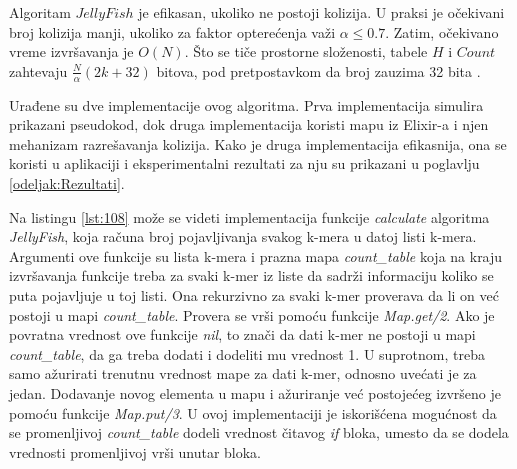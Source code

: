 \documentclass[12pt,oneside]{memoir}
\begin{document}
\begin{comment}

\begin{figure}[!ht]
  \centering
  \texttt{[image: 58\_3algoritma.PNG]}
  \caption{Razmatra se skup 4-mera $Z = \{AC; CG; AC; GT; CA; GG; AC; GT\}$: (a) Ilustruje jednostavan metod za brojanje k-mera koji koristi tabelu \textit{Count} veličine 4k. (b) Ilustruje \textit{JellyFish} metod brojanja k-mera koja koristi heš tabelu veličine 7. Heš funkcija je $h(z) = b(z)$ \textit{mod} $7$. Na primer, $GT$ se čuva u tabeli $Count$ sa indeksom 4, jer je $h(GT) = 4$. U ovom primeru se javlja jedna kolizija. Pošto je i $h(CA) = 4$, $CA$ je u koliziji sa $GT$. Linearnim isprobavanjem $CA$ se ipak čuva u tabeli $Count$ sa indeksom 5. (c) Ilustruje DSK metod brojanja k-mera.
Pretpostavka je da je $h(z) = b(z)$, $n_{list} = 2$ i $n_{sublist} = 2$. DSK deli Z u
4 ($= n_{list} * n_{sublist}$) podliste, a zatim pokreće \textit{JellyFish} algoritam za brojanje k-mera u svakoj podlisti.}
  \label{fig:5}
  \source{\cite{WingKinSung}}
\end{figure}

Slika \ref{fig:5}(b) daje primer koji ilustruje algoritam $JellyFish$. 
\end{comment}

Algoritam $JellyFish$ je efikasan, ukoliko ne postoji kolizija. U praksi je očekivani broj kolizija manji, ukoliko za faktor opterećenja važi $\alpha \leq 0.7$. Zatim, očekivano vreme izvršavanja je $O(N)$. Što se tiče prostorne složenosti, tabele $H$ i $Count$ zahtevaju $\frac{N}{\alpha}(2k + 32)$ bitova, pod pretpostavkom da broj zauzima 32 bita \cite{WingKinSung}.

Urađene su  dve implementacije ovog algoritma. Prva implementacija simulira prikazani pseudokod, dok druga implementacija koristi mapu iz Elixir-a i njen mehanizam razrešavanja kolizija. Kako je druga implementacija efikasnija, ona se koristi u aplikaciji i eksperimentalni rezultati za nju su prikazani u poglavlju \ref{odeljak:Rezultati}. 

Na listingu \ref{lst:108} može se videti implementacija funkcije \textit{calculate} algoritma \textit{JellyFish}, koja računa broj pojavljivanja svakog k-mera u datoj listi k-mera. Argumenti ove funkcije su lista k-mera i prazna mapa \textit{count\_table} koja na kraju izvršavanja funkcije treba za svaki k-mer iz liste da sadrži informaciju koliko se puta pojavljuje u toj listi. Ona rekurzivno za svaki k-mer proverava da li on već postoji u mapi \textit{count\_table}. Provera se vrši pomoću funkcije \textit{Map.get/2}. Ako je povratna vrednost ove funkcije \textit{nil}, to znači da dati k-mer ne postoji u mapi \textit{count\_table}, da ga treba dodati i dodeliti mu vrednost 1. U suprotnom, treba samo ažurirati trenutnu vrednost mape za dati k-mer, odnosno uvećati je za jedan. Dodavanje novog elementa u mapu i ažuriranje već postojećeg izvršeno je pomoću funkcije \textit{Map.put/3}. U ovoj implementaciji je iskorišćena mogućnost da se promenljivoj \textit{count\_table} dodeli vrednost čitavog \textit{if} bloka, umesto da se dodela vrednosti promenljivoj vrši unutar bloka.
\end{document}

